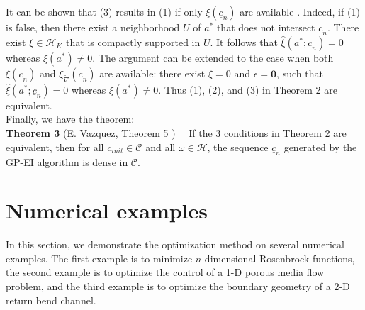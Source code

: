 \documentclass[a4paper,onecolumn]{article}
\theoremstyle{remark}
\begin{document}
It can be shown that (3) results in (1) if only $\xi(\underline{c}_n)$
are available \cite{convergen EI}. Indeed, if (1) is false, then there exist a neighborhood
$U$ of $a^*$ that does not intersect $\underline{c}_n$. There exist $\xi\in \mathcal{H}_K$
that is compactly supported in $U$. It follows that $\hat{\xi}(a^*; \underline{c}_n) = 0$ whereas
$\xi(a^*) \neq 0$.
The argument can be extended to the case when both $\xi(\underline{c}_n)$ and 
$\xi_{\tilde{\nabla}}(\underline{c}_n)$ are
available: there exist $\xi = 0$ and $\epsilon = \textbf{0}$, such that 
$\hat{\xi}(a^*; \underline{c}_n) = 0$ whereas $\xi(a^*) \neq 0$.
Thus (1), (2), and (3) in Theorem 2 are equivalent.\\

Finally, we have the theorem:\\
\textbf{Theorem 3} (E. Vazquez, Theorem 5 \cite{convergen EI})$\quad$ If the 3 conditions in Theorem 2 
are equivalent, then for all $c_{init}\in \mathcal{C}$ and all $\omega \in \mathcal{H}$, the sequence 
$\underline{c}_n$ generated by the GP-EI algorithm is dense in $\mathcal{C}$.\\

\section{Numerical examples}
In this section, we demonstrate the optimization method on several numerical examples. The first example
is to minimize $n$-dimensional Rosenbrock functions, the second example is to optimize the control 
of a 1-D porous media flow problem, 
and the third example is to optimize the boundary geometry of a 2-D return
bend channel.
\end{document}
